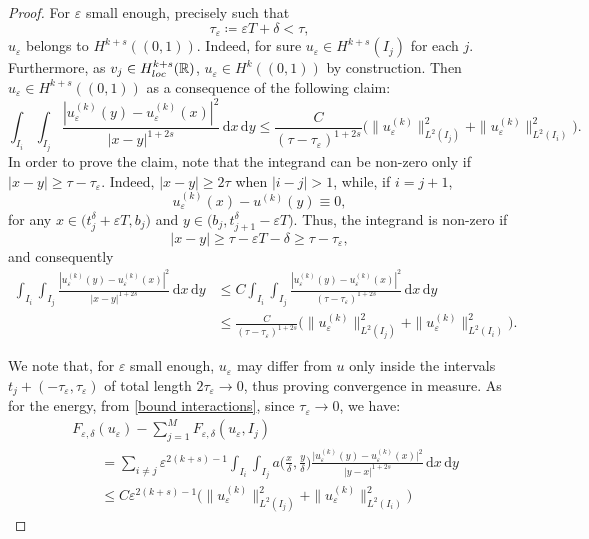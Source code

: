 \documentclass[10pt,a4paper]{amsart}
\newcommand{\R}{\mathbb{R}}
\newcommand{\del}{\delta}
\newcommand{\de}{\mathrm{d}}
\newcommand{\e}{\varepsilon}
\begin{document}
\begin{proof}
    For $\e$ small enough, precisely such that 
    \begin{equation*}
        \tau_\e\coloneqq \e T+\delta<\tau,
    \end{equation*} $u_\e$ belongs to $H^{k+s}((0,1))$.
    Indeed, for sure $u_\e\in H^{k+s}(I_j)$ for each $j$. Furthermore, as $v_j\in H^{k+s}_{\rm loc}(\R)$, $u_\e\in H^k((0,1))$ by construction.  %
    Then $u_\e\in H^{k+s}((0,1))$ as a consequence of the following claim:
    \begin{equation}
    \label{bound interactions}
        \int_{I_i}\int_{I_j} \frac{|u^{(k)}_\e(y)-u^{(k)}_\e(x)|^2}{|x-y|^{1+2s}} \,\de x\,\de y \leq \frac{C}{(\tau-\tau_\e)^{1+2s}}\big(\|u_\e^{(k)}\|^2_{L^2(I_j)} +  \|u_\e^{(k)}\|^2_{L^2(I_i)}\big).
    \end{equation}
    In order to prove the claim, note that the integrand can be non-zero only if
$|x-y|\geq \tau-\tau_\e$. Indeed, $|x-y|\geq 2\tau$  when  $|i-j|>1$, while, if $i=j+1$, 
\[u^{(k)}_\e(x)-u^{(k)}(y) \equiv 0,\]
for any $x\in\big(t_j^\delta+\e T, b_j)$ and $y\in(b_j,t_{j+1}^\delta-\e T\big)$. Thus, the integrand is non-zero if
\[|x-y| \geq \tau-\e T-\delta\geq \tau-\tau_\e,\]
and consequently 
\begin{align*}
   \int_{I_i}\int_{I_j} \frac{|u^{(k)}_\e(y)-u^{(k)}_\e(x)|^2}{|x-y|^{1+2s}} \,\de x\,\de y&\leq C\int_{I_i}\int_{I_j} \frac{|u^{(k)}_\e(y)-u^{(k)}_\e(x)|^2}{(\tau-\tau_\e)^{1+2s}} \,\de x\,\de y \\
    &\leq \frac{C}{(\tau-\tau_\e)^{1+2s}}\big(\|u_\e^{(k)}\|^2_{L^2(I_j)} +  \|u_\e^{(k)}\|^2_{L^2(I_i)}\big).
\end{align*}


    We note that, for $\e$ small enough, $u_\e$ may differ from $u$ only inside the intervals $t_j+(-\tau_\e,\tau_\e)$
    of total length $2\tau_\e\rightarrow 0$, thus proving convergence in measure. As for the energy, from \eqref{bound interactions}, since $\tau_\e\to 0$, we have:
\begin{equation}\label{eq:energy_difference_recovery}
    \begin{split}
          & F_{\e,\del}(u_\e) - \sum_{j=1}^M F_{\e,\del}(u_\e, I_j) \\
           &\qquad =\sum_{i\neq j} \e^{2(k+s)-1} \int_{I_i}\int_{I_j}a\Big(\frac{x}{\delta},\frac{y}{\delta}\Big)\frac{\big|{u^{(k)}_\e(y)-u^{(k)}_\e(x)}\big|^2}{|y-x|^{1+2s}} \,\de x\,\de y\\
           &\qquad\leq C \e^{2(k+s)-1}\big(\|u_\e^{(k)}\|^2_{L^2(I_j)} +  \|u_\e^{(k)}\|^2_{L^2(I_i)}\big)
    \end{split}
\end{equation}


\end{proof}
\end{document}
